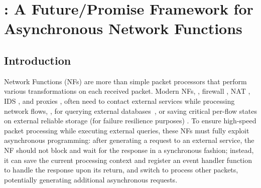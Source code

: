 \chapter {\netstar: A Future/Promise Framework for Asynchronous Network Functions}
\label{ch:netstar}

\section{Introduction}

Network Functions (NFs) are more than simple packet processors that perform various transformations on each received packet. Modern NFs, \eg, firewall \cite{201545}, NAT \cite{201545}, IDS \cite{bro}, and proxies \cite{haproxy, project-clearwater}, often need to contact external services while processing network flows, \eg, for
querying external databases~\cite{telephone-number-mapping, bro-scripting-tutorial}, or saving critical per-flow states on external reliable storage (for failure resilience purposes) \cite{201545}. To ensure high-speed packet processing while executing external queries, these NFs must fully exploit asynchronous programming: after generating a request to an external service, the NF should not block and wait for the response in a synchronous fashion; instead, it can save the current processing context and register an event handler function to handle the response upon its return, and switch to process other packets, potentially generating additional asynchronous requests.



